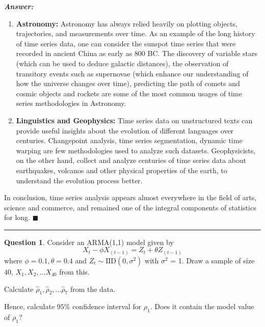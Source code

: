 \documentclass[12pt]{article}
\theoremstyle{definition}
\newtheorem{question}{Question}
\newenvironment{answer}{
    \textbf{\textit{Answer:}} \qquad
}{\hfill $\blacksquare$ \\ \begin{center}
    \rule{0.6\linewidth}{0.5px}    
\end{center}
}
\begin{document}
\begin{answer}
\begin{enumerate}
        \item \textbf{Astronomy: } Astronomy has always relied heavily on plotting objects, trajectories, and measurements over time. As an example of the long history of time series data, one can consider the sunspot time series that were recorded in ancient China as early as 800 BC. The discovery of variable stars (which can be used to deduce galactic distances), the observation of transitory events such as supernovae (which enhance our understanding of how the universe changes over time), predicting the path of comets and cosmic objects and rockets are some of the most common usages of time series methodologies in Astronomy.
        \item \textbf{Linguistics and Geophysics: } Time series data on unstructured texts can provide useful insights about the evolution of different languages over centuries. Changepoint analysis, time series segmentation, dynamic time warping are few methodologies used to analyze such datasets. Geophysicists, on the other hand, collect and analyze centuries of time series data about earthquakes, volcanos and other physical properties of the earth, to understand the evolution process better.
    \end{enumerate}   
    In conclusion, time series analysis appears almost everywhere in the field of arts, science and commerce, and remained one of the integral components of statistics for long.
\end{answer}



\begin{question}
    Consider an ARMA(1,1) model given by 
    $$
    X_t - \phi X_{(t-1)} = Z_t + \theta Z_{(t-1)}
    $$
    where $\phi = 0.1, \theta = 0.4$ and $Z_t \sim \text{IID}(0, \sigma^2)$ with $\sigma^2$ = 1.
    Draw a sample of size $40$, $X_1, X_2, \dots X_{40}$ from this.

    Calculate $\widehat{\rho}_1, \widehat{\rho}_2, \dots \widehat{\rho}_7$ from the data. 

    Hence, calculate $95\%$ confidence interval for $\rho_1$. Does it contain the model value of $\rho_1$?
\end{question}
\end{document}
